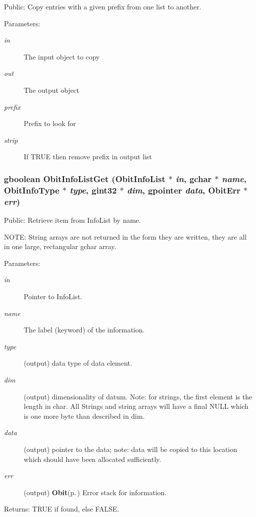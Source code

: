 Public: Copy entries with a given prefix from one list to another. 

\begin{Desc}
\item[Parameters:]
\begin{description}
\item[{\em in}]The input object to copy \item[{\em out}]The output object \item[{\em prefix}]Prefix to look for \item[{\em strip}]If TRUE then remove prefix in output list \end{description}
\end{Desc}
\subsubsection{\setlength{\rightskip}{0pt plus 5cm}gboolean Obit\-Info\-List\-Get ({\bf Obit\-Info\-List} $\ast$ {\em in}, gchar $\ast$ {\em name}, Obit\-Info\-Type $\ast$ {\em type}, gint32 $\ast$ {\em dim}, gpointer {\em data}, {\bf Obit\-Err} $\ast$ {\em err})}\label{ObitInfoList_8h_a13}


Public: Retrieve item from Info\-List by name. 

NOTE: String arrays are not returned in the form they are written, they are all in one large, rectangular gchar array. \begin{Desc}
\item[Parameters:]
\begin{description}
\item[{\em in}]Pointer to Info\-List. \item[{\em name}]The label (keyword) of the information. \item[{\em type}](output) data type of data element. \item[{\em dim}](output) dimensionality of datum. Note: for strings, the first element is the length in char. All Strings and string arrays will have a final NULL which is one more byte than described in dim. \item[{\em data}](output) pointer to the data; note: data will be copied to this location which should have been allocated sufficiently. \item[{\em err}](output) {\bf Obit}{\rm (p.\,\pageref{structObit})} Error stack for information. \end{description}
\end{Desc}
\begin{Desc}
\item[Returns:]TRUE if found, else FALSE. \end{Desc}
